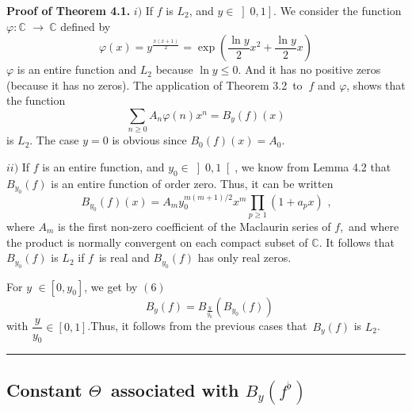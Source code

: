 \documentclass{article}
\newenvironment{proof}[1][Proof]{\textbf{#1.} }{\ \rule{0.5em}{0.5em}}
\begin{document}
\bigskip

\begin{proof}[Proof of Theorem 4.1]
$i)$ If $f$ is $L_{2}$, and $y\in \left] 0,1\right] $. We consider the
function $\varphi :\mathbb{C}$ $\longrightarrow \ \mathbb{C}$ defined by 
\begin{equation*}
\varphi \left( x\right) =y^{\tfrac{x\left( x+1\right) }{2}}=\exp \left( 
\frac{\ln y}{2}x^{2}+\frac{\ln y}{2}x\right) 
\end{equation*}
$\varphi $ is an entire function and $L_{2}$ because $\ln y\leq 0$. And it
has no positive zeros (because it has no zeros). The application of Theorem
3.2\ to $\ f$ and $\varphi $, shows that the function 
\begin{equation*}
\sum\limits_{n\geq 0}A_{n}\varphi \left( n\right) x^{n}=B_{y}\left( f\right)
\left( x\right) 
\end{equation*}
is $L_{2}$. The case $y=0$ is obvious since $B_{0}\left( f\right) \left(
x\right) =A_{0}$.

$ii)$ If $f$ is an entire function, and $y_{0}\in \left] 0,1\right[ $, we
know from Lemma 4.2 that $B_{y_{0}}\left( f\right) $ is an entire function
of order zero. Thus, it can be written 
\begin{equation*}
B_{y_{0}}\left( f\right) \left( x\right) =A_{m}y_{0}^{m\left( m+1\right)
/2}x^{m}\prod\limits_{p\geq 1}\left( 1+a_{p}x\right) \text{ ,}
\end{equation*}
where $A_{m}$ is the first non-zero coefficient of the Maclaurin series of $f
$,\ and where the product is normally convergent on each compact subset of $\mathbb{C}$. It follows that $B_{y_{0}}\left( f\right) $ is $L_{2}$ if $f$\
is real and $B_{y_{0}}\left( f\right) $ has only real zeros.

For $y$ $\in \left[ 0,y_{0}\right] $, we get by $\left( 6\right) $\begin{equation*}
\text{\ }B_{y}\left( f\right) =B_{\tfrac{y}{y_{0}}}\left( B_{y_{0}}\left(
f\right) \right) 
\end{equation*}
with $\dfrac{y}{y_{0}}\in \left[ 0,1\right] $.Thus, it follows from the
previous cases that\ $B_{y}\left( f\right) $ is $L_{2}$.
\end{proof}

\bigskip

\subsection{\protect\bigskip Constant $\Theta $\ associated with $B_{y}\left( f^{\flat }\right) $}
\end{document}
